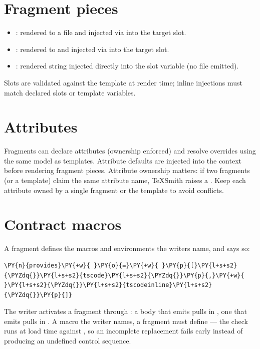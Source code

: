 \documentclass[a4paper,twoside]{article}
\begin{document}
\section{Fragment pieces}
\begin{itemize}
\item {}: rendered to a  file and injected via  into the target slot.
\item {}: rendered to  and injected via  into the target slot.
\item {}: rendered string injected directly into the slot variable (no file emitted).
\end{itemize}
Slots are validated against the template at render time; inline injections must match declared slots or template variables.
\section{Attributes}
Fragments can declare attributes (ownership enforced) and resolve overrides using the same  model as templates. Attribute defaults are injected into the context before rendering fragment pieces. Attribute ownership matters: if two fragments (or a template) claim the same attribute name, TeXSmith raises a . Keep each attribute owned by a single fragment or the template to avoid conflicts.
\section{Contract macros}
A fragment defines the macros and environments the writers name, and says so:
\begin{tscode}[lang=toml, engine=pygments]
\begin{Verbatim}[commandchars=\\\{\},breaklines, breakanywhere, commandchars=\\\{\}]
\PY{n}{provides}\PY{+w}{ }\PY{o}{=}\PY{+w}{ }\PY{p}{[}\PY{l+s+s2}{\PYZdq{}}\PY{l+s+s2}{tscode}\PY{l+s+s2}{\PYZdq{}}\PY{p}{,}\PY{+w}{ }\PY{l+s+s2}{\PYZdq{}}\PY{l+s+s2}{tscodeinline}\PY{l+s+s2}{\PYZdq{}}\PY{p}{]}
\end{Verbatim}
\end{tscode}
The writer activates a fragment through : a body that emits
 pulls in , one that emits  pulls in
. A macro the writer names, a fragment must define --- the check runs at
load time against , so an incomplete replacement fails early
instead of producing an undefined control sequence.
\end{document}
